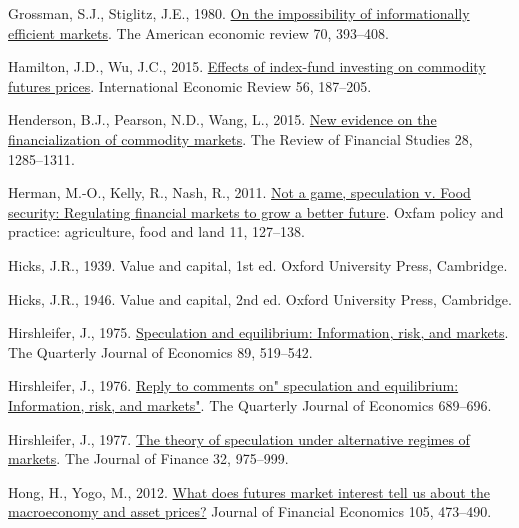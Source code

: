 \documentclass[]{elsarticle} %
\newlength{\cslhangindent}
\newlength{\cslentryspacingunit} %
\newenvironment{CSLReferences}[2] %
 {%
  \setlength{\parindent}{0pt}
  \ifodd #1
  \let\oldpar\par
  \def\par{\hangindent=\cslhangindent\oldpar}
  \fi
  \setlength{\parskip}{#2\cslentryspacingunit}
 }%
 {}
\begin{document}
\begin{CSLReferences}{1}{0}
\leavevmode{}%
Grossman, S.J., Stiglitz, J.E., 1980. \href{https://doi.org/10.7916/D8765R99}{On the impossibility of informationally efficient markets}. The American economic review 70, 393--408.

\leavevmode{}%
Hamilton, J.D., Wu, J.C., 2015. \href{https://doi.org/10.1111/iere.12099}{Effects of index-fund investing on commodity futures prices}. International Economic Review 56, 187--205.

\leavevmode{}%
Henderson, B.J., Pearson, N.D., Wang, L., 2015. \href{https://doi.org/10.1093/rfs/hhu091}{New evidence on the financialization of commodity markets}. The Review of Financial Studies 28, 1285--1311.

\leavevmode{}%
Herman, M.-O., Kelly, R., Nash, R., 2011. \href{https://www.ingentaconnect.com/content/oxpp/oppafl/2011/00000011/00000007/art00005}{Not a game, speculation v. Food security: Regulating financial markets to grow a better future}. Oxfam policy and practice: agriculture, food and land 11, 127--138.

\leavevmode{}%
Hicks, J.R., 1939. Value and capital, 1st ed. Oxford University Press, Cambridge.

\leavevmode{}%
Hicks, J.R., 1946. Value and capital, 2nd ed. Oxford University Press, Cambridge.

\leavevmode{}%
Hirshleifer, J., 1975. \href{https://doi.org/10.2307/1884690}{Speculation and equilibrium: Information, risk, and markets}. The Quarterly Journal of Economics 89, 519--542.

\leavevmode{}%
Hirshleifer, J., 1976. \href{https://doi.org/10.2307/1885330}{Reply to comments on" speculation and equilibrium: Information, risk, and markets"}. The Quarterly Journal of Economics 689--696.

\leavevmode{}%
Hirshleifer, J., 1977. \href{https://doi.org/10.2307/2326507}{The theory of speculation under alternative regimes of markets}. The Journal of Finance 32, 975--999.

\leavevmode{}%
Hong, H., Yogo, M., 2012. \href{https://doi.org/10.1016/j.jfineco.2012.04.005}{What does futures market interest tell us about the macroeconomy and asset prices?} Journal of Financial Economics 105, 473--490.


\end{CSLReferences}
\end{document}
